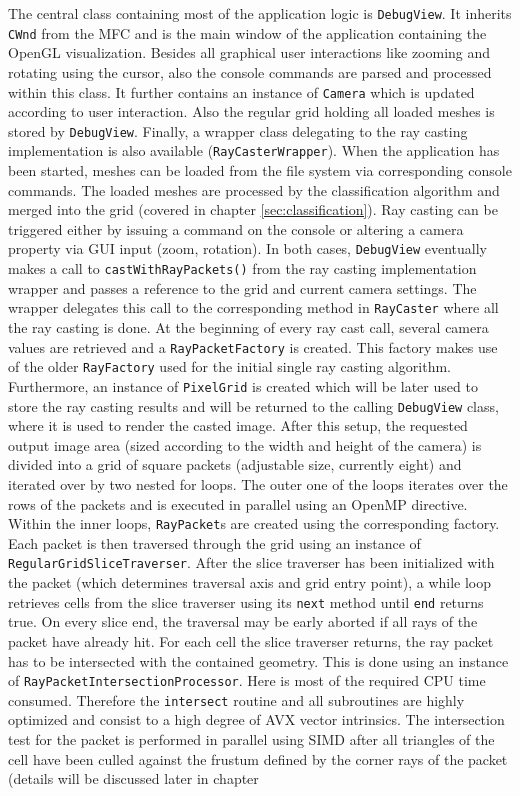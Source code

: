 The central class containing most of the application logic is \lstinline!DebugView!. It inherits \lstinline!CWnd! from the MFC and is the main window of the application containing the OpenGL visualization. Besides all graphical user interactions like zooming and rotating using the cursor, also the console commands are parsed and processed within this class. It further contains an instance of \lstinline!Camera! which is updated according to user interaction. Also the regular grid holding all loaded meshes is stored by \lstinline!DebugView!. Finally, a wrapper class delegating to the ray casting implementation is also available (\lstinline!RayCasterWrapper!). When the application has been started, meshes can be loaded from the file system via corresponding console commands. The loaded meshes are processed by the classification algorithm and merged into the grid (covered in chapter \ref{sec:classification}). Ray casting can be triggered either by issuing a command on the console or altering a camera property via GUI input (zoom, rotation). In both cases, \lstinline!DebugView! eventually makes a call to \lstinline!castWithRayPackets()! from the ray casting implementation wrapper and passes a reference to the grid and current camera settings. The wrapper delegates this call to the corresponding method in \lstinline!RayCaster! where all the ray casting is done. At the beginning of every ray cast call, several camera values are retrieved and a \lstinline!RayPacketFactory! is created. This factory makes use of the older \lstinline!RayFactory! used for the initial single ray casting algorithm. Furthermore, an instance of \lstinline!PixelGrid! is created which will be later used to store the ray casting results and will be returned to the calling \lstinline!DebugView! class, where it is used to render the casted image. After this setup, the requested output image area (sized according to the width and height of the camera) is divided into a grid of square packets (adjustable size, currently eight) and iterated over by two nested for loops. The outer one of the loops iterates over the rows of the packets and is executed in parallel using an OpenMP directive. Within the inner loops, \lstinline!RayPacket!s are created using the corresponding factory. Each packet is then traversed through the grid using an instance of \lstinline!RegularGridSliceTraverser!. After the slice traverser has been initialized with the packet (which determines traversal axis and grid entry point), a while loop retrieves cells from the slice traverser using its \lstinline!next! method until \lstinline!end! returns true. On every slice end, the traversal may be early aborted if all rays of the packet have already hit. For each cell the slice traverser returns, the ray packet has to be intersected with the contained geometry. This is done using an instance of \lstinline!RayPacketIntersectionProcessor!. Here is most of the required CPU time consumed. Therefore the \lstinline!intersect! routine and all subroutines are highly optimized and consist to a high degree of AVX vector intrinsics. The intersection test for the packet is performed in parallel using SIMD after all triangles of the cell have been culled against the frustum defined by the corner rays of the packet (details will be discussed later in chapter 